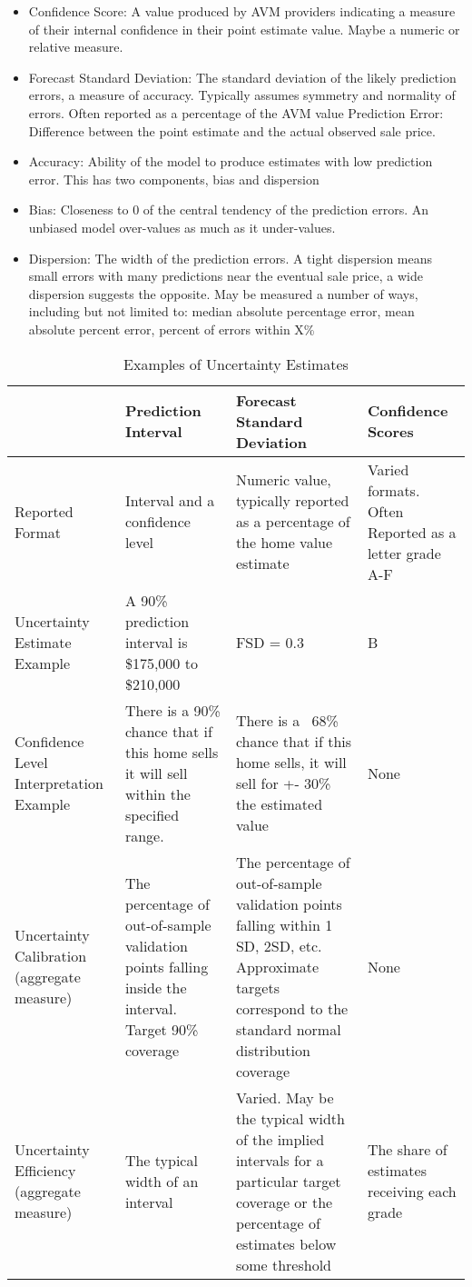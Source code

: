 \documentclass[colTwo]{format}
\theoremstyle{definition}
\begin{document}
\begin{itemize}
\item Confidence Score: A value produced by AVM providers indicating a measure of their internal confidence in their point estimate value.  Maybe a numeric or relative measure. 
\item Forecast Standard Deviation:  The standard deviation of the likely prediction errors, a measure of accuracy.  Typically assumes symmetry and normality of errors. Often reported as a percentage of the AVM value
Prediction Error: Difference between the point estimate and the actual observed sale price.
\item Accuracy: Ability of the model to produce estimates with low prediction error.  This has two components, bias and dispersion
\item Bias: Closeness to 0 of the central tendency of the prediction errors.  An unbiased model over-values as much as it under-values.  
\item Dispersion: The width of the prediction errors.  A tight dispersion means small errors with many predictions near the eventual sale price, a wide dispersion suggests the opposite.  May be measured a number of ways, including but not limited to: median absolute percentage error, mean absolute percent error, percent of errors within X\%
\end{itemize}


\begin{table*}[h!]
\centering
\begin{tabular}{|p{2.4cm} | p{3.99cm} | p{3.99cm} | p{3.99cm} |} 
 \hline
  & \textbf{Prediction Interval} & \textbf{Forecast Standard Deviation} & \textbf{Confidence Scores} \\ [0.5ex] 
 \hline\hline
 Reported Format & Interval and a confidence level & Numeric value, typically reported as a percentage of the home value estimate & Varied formats. Often Reported as a letter grade A-F \\ \hline
 Uncertainty Estimate Example & A 90\% prediction interval is \$175,000 to \$210,000 & FSD = 0.3 & B \\
 \hline
Confidence Level Interpretation Example & There is a 90\% chance that if this home sells it will sell within the specified range. & There is a ~68\% chance that if this home sells, it will sell for +- 30\% the estimated value & None \\
\hline
Uncertainty Calibration
(aggregate measure) & The percentage of out-of-sample validation points falling inside the interval. Target 90\% coverage & The percentage of out-of-sample validation points falling within 1 SD, 2SD, etc. Approximate targets correspond to the standard normal distribution coverage & None \\
\hline
 Uncertainty Efficiency
(aggregate measure)
 & The typical width of an interval & Varied. May be the typical width of the implied intervals for a particular target coverage or the percentage of estimates below some threshold & The share of estimates receiving each grade \\ [1ex] 
 \hline
\end{tabular}
\caption{Examples of Uncertainty Estimates}
\label{table:1}
\end{table*}
\end{document}
